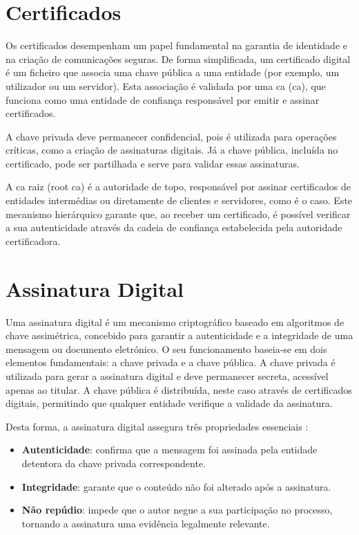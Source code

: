 \section{Certificados}

Os certificados desempenham um papel fundamental na garantia de identidade e na criação de comunicações seguras. De forma simplificada, um certificado digital é um ficheiro que associa uma chave pública a uma entidade (por exemplo, um utilizador ou um servidor). Esta associação é validada por uma \acrlong{ca} (\acrshort{ca}), que funciona como uma entidade de confiança responsável por emitir e assinar certificados.

A chave privada deve permanecer confidencial, pois é utilizada para operações críticas, como a criação de assinaturas digitais. Já a chave pública, incluída no certificado, pode ser partilhada e serve para validar essas assinaturas.

A \acrshort{ca} raiz (root \acrshort{ca}) é a autoridade de topo, responsável por assinar certificados de entidades intermédias ou diretamente de clientes e servidores, como é o caso. Este mecanismo hierárquico garante que, ao receber um certificado, é possível verificar a sua autenticidade através da cadeia de confiança estabelecida pela autoridade certificadora.

\section{Assinatura Digital}

Uma assinatura digital é um mecanismo criptográfico baseado em algoritmos de chave assimétrica, concebido para garantir a autenticidade e a integridade de uma mensagem ou documento eletrónico. O seu funcionamento baseia-se em dois elementos fundamentais: a chave privada e a chave pública. A chave privada é utilizada para gerar a assinatura digital e deve permanecer secreta, acessível apenas ao titular. A chave pública é distribuída, neste caso através de certificados digitais, permitindo que qualquer entidade verifique a validade da assinatura.

Desta forma, a assinatura digital assegura três propriedades essenciais \citep{digitalsignatures}:
\begin{itemize}
    \item \textbf{Autenticidade}: confirma que a mensagem foi assinada pela entidade detentora da chave privada correspondente.
    \item \textbf{Integridade}: garante que o conteúdo não foi alterado após a assinatura.
    \item \textbf{Não repúdio}: impede que o autor negue a sua participação no processo, tornando a assinatura uma evidência legalmente relevante.
\end{itemize}


